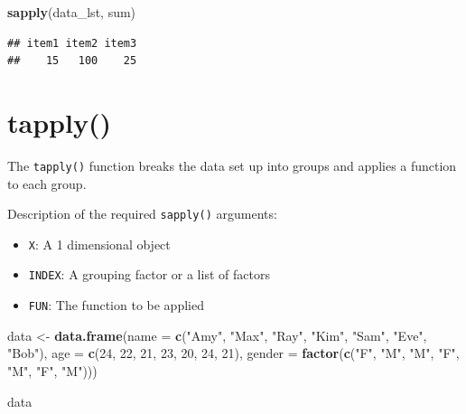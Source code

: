 \documentclass[
]{book}
\newenvironment{Shaded}{\begin{snugshade}}{\end{snugshade}}
\newcommand{\DataTypeTok}[1]{\textcolor[rgb]{0.13,0.29,0.53}{#1}}
\newcommand{\DecValTok}[1]{\textcolor[rgb]{0.00,0.00,0.81}{#1}}
\newcommand{\KeywordTok}[1]{\textcolor[rgb]{0.13,0.29,0.53}{\textbf{#1}}}
\newcommand{\NormalTok}[1]{#1}
\newcommand{\StringTok}[1]{\textcolor[rgb]{0.31,0.60,0.02}{#1}}
\providecommand{\tightlist}{%
  \setlength{\itemsep}{0pt}\setlength{\parskip}{0pt}}
\begin{document}
\begin{Shaded}
\begin{Highlighting}[]
\KeywordTok{sapply}\NormalTok{(data_lst, sum)}
\end{Highlighting}
\end{Shaded}

\begin{verbatim}
## item1 item2 item3 
##    15   100    25
\end{verbatim}

\hypertarget{tapply}{%
\section{tapply()}\label{tapply}}

The \texttt{tapply()} function breaks the data set up into groups and applies a function to each group.

Description of the required \texttt{sapply()} arguments:

\begin{itemize}
\tightlist
\item
  \texttt{X}: A 1 dimensional object
\item
  \texttt{INDEX}: A grouping factor or a list of factors
\item
  \texttt{FUN}: The function to be applied
\end{itemize}

\begin{Shaded}
\begin{Highlighting}[]
\NormalTok{data <-}\StringTok{ }\KeywordTok{data.frame}\NormalTok{(}\DataTypeTok{name =} \KeywordTok{c}\NormalTok{(}\StringTok{"Amy"}\NormalTok{,}
    \StringTok{"Max"}\NormalTok{, }\StringTok{"Ray"}\NormalTok{, }\StringTok{"Kim"}\NormalTok{,}
    \StringTok{"Sam"}\NormalTok{, }\StringTok{"Eve"}\NormalTok{, }\StringTok{"Bob"}\NormalTok{),}
    \DataTypeTok{age =} \KeywordTok{c}\NormalTok{(}\DecValTok{24}\NormalTok{, }\DecValTok{22}\NormalTok{, }\DecValTok{21}\NormalTok{,}
        \DecValTok{23}\NormalTok{, }\DecValTok{20}\NormalTok{, }\DecValTok{24}\NormalTok{, }\DecValTok{21}\NormalTok{),}
    \DataTypeTok{gender =} \KeywordTok{factor}\NormalTok{(}\KeywordTok{c}\NormalTok{(}\StringTok{"F"}\NormalTok{,}
        \StringTok{"M"}\NormalTok{, }\StringTok{"M"}\NormalTok{, }\StringTok{"F"}\NormalTok{,}
        \StringTok{"M"}\NormalTok{, }\StringTok{"F"}\NormalTok{, }\StringTok{"M"}\NormalTok{)))}

\NormalTok{data}
\end{Highlighting}
\end{Shaded}
\end{document}
